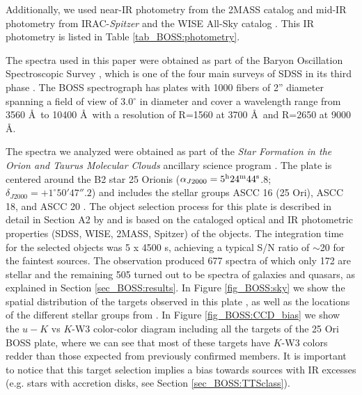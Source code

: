 \documentclass[12pt]{article}
\newcounter{subsubsubsection}[subsubsection]
\begin{document}
Additionally, we used near-IR photometry from the 2MASS catalog \citep{Skrutskie2006} and mid-IR photometry from IRAC-\textit{Spitzer} \citep[][]{Hernandez2007b} and the WISE All-Sky catalog \citep{Cutri2013}. This IR photometry is listed in Table \ref{tab_BOSS:photometry}.

\label{sec_BOSS:spectroscopy}
The spectra used in this paper were obtained as part of the Baryon Oscillation Spectroscopic Survey \citep[BOSS; ][]{Dawson2013}, which is one of the four main surveys of SDSS \citep[][]{York2000} in its third phase \citep[SDSS-III; ][]{Eisenstein2011}. The BOSS spectrograph has plates with 1000 fibers of 2'' diameter spanning a field of view of 3.0$^\circ$ in diameter and cover a wavelength range from 3560 \AA\ to 10400 \AA\ with a resolution of R=1560 at 3700 \AA\ and R=2650 at 9000 \AA \citep{Gunn2006,Smee2013}. 

The spectra we analyzed were obtained as part of the {\it Star Formation in the Orion and Taurus Molecular Clouds} ancillary science program \citep{Alam2015}. The plate is centered around the B2 star 25 Orionis ($\alpha_{J2000}= 5^{\rm h} 24^{\rm m} 44^{\rm s}$.8; $\delta_{J2000} = +1^{\circ} 50' 47''.2$) and includes the stellar groups ASCC 16 (25 Ori), ASCC 18, and ASCC 20 \citep{Kharchenko2013}. The object selection process for this plate is described in detail in Section A2 by \citet{Alam2015} and is based on the cataloged optical and IR photometric properties (SDSS, WISE, 2MASS, Spitzer) of the objects. The integration time for the selected objects was 5 x 4500 s, achieving a typical S/N ratio of $\sim$20 for the faintest sources. The observation produced 677 spectra of which only 172 are stellar and the remaining 505 turned out to be spectra of galaxies and quasars, as explained in Section \ref{sec_BOSS:results}. In Figure \ref{fig_BOSS:sky} we show the spatial distribution of the targets observed in this plate \citep{Alam2015}, as well as the locations of the different stellar groups from \citet{Kharchenko2013}. In Figure \ref{fig_BOSS:CCD_bias} we show the $u-K$ vs $K$-W3 color-color diagram including all the targets of the 25 Ori BOSS plate, where we can see that most of these targets have $K$-W3 colors redder than those expected from previously confirmed members. It is important to notice that this target selection implies a bias towards sources with IR excesses (e.g. stars with accretion disks, see Section \ref{sec_BOSS:TTSclass}).
\end{document}
